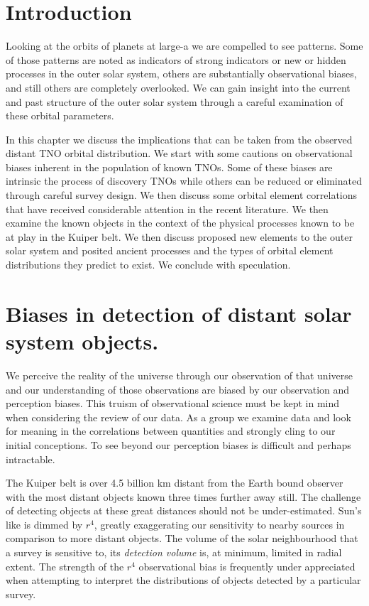 \documentclass{aastex62}
\begin{document}
\section{Introduction}

Looking at the orbits of planets at large-a we are compelled to see
patterns. Some of those patterns are noted as indicators of strong
indicators or new or hidden processes in the outer solar system,
others are substantially observational biases, and still others are
completely overlooked. We can gain insight into the current and past
structure of the outer solar system through a careful examination of
these orbital parameters.

In this chapter we discuss the implications that can be taken from the observed distant TNO orbital distribution.  We start with some cautions on observational biases inherent in the population of known TNOs.  Some of these biases are intrinsic the process of discovery TNOs while others can be reduced or eliminated through careful survey design. We then discuss some orbital element correlations that have received considerable attention in the recent literature. We then examine the known objects in the context of the physical processes known to be at play in the Kuiper belt.  We then discuss proposed new elements to the outer solar system and posited ancient processes and the types of orbital element distributions they predict to exist.  We conclude with speculation.

\section{Biases in detection of distant solar system objects.}

We perceive the reality of the universe through our observation of that universe and our understanding of those observations are biased by our observation and perception biases. This truism of observational science must be kept in mind when considering the review of our data. As a group we examine data and look for meaning in the correlations between quantities and strongly cling to our initial conceptions.  To see beyond our perception biases is difficult and perhaps intractable. 

The Kuiper belt is over 4.5 billion km distant from the Earth bound observer with the most distant objects known three times further away still.  The challenge of detecting objects at these great distances should not be under-estimated.  Sun's like is dimmed by $r^4$, greatly exaggerating our sensitivity to nearby sources in comparison to more distant objects.  The volume of the solar neighbourhood that a survey is sensitive to, its {\it detection volume}  is, at minimum, limited in radial extent. The strength of the $r^4$ observational bias is frequently under appreciated when attempting to interpret the distributions of objects detected by a particular survey.
\end{document}
